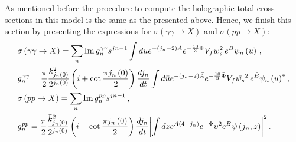 \documentclass[a4paper,12pt]{article}
\begin{document}
As mentioned before the procedure to compute the holographic total cross-sections in this model is the same as the presented above. Hence, we finish this section by presenting the expressions for $\sigma\left(\gamma \gamma \to X\right)$ and $\sigma\left(p p \to X\right)$:
\begin{align}
&\sigma\left(\gamma \gamma \rightarrow X\right) =  \sum_n {\rm Im} \, g^{\gamma \gamma}_n s^{jn-1} \int du e^{-\left(j_n - 2 \right)A } e^{-\frac{10}{3} \Phi} V_f w_s^2  \, e^B \psi_n\left(u\right)  \, , \label{eq:sigma_gg_hol_gens}  \\
&g^{\gamma \gamma}_n = \frac{\pi}{2} \frac{k^2_{j_n\left(0\right)}}{2^{j_n\left(0\right)}}  \left(i + \cot \frac{\pi j_n\left(0\right)}{2} \right) \frac{d j_n}{dt}  \int d\bar{u} e^{-\left(j_n - 2 \right)\bar{A} } e^{-\frac{10}{3} \bar{\Phi}} \bar{V_f} \bar{w_s}^2  \, e^{\bar{B}} {\psi_n\left(u\right)}^{*} \, , \\
& \sigma\left( p p \to X \right) = \sum_n {\rm Im} \, g^{p p}_n s^{jn-1}  \, , \label{eq:sigma_pp_hol_gens} \\
&g^{p p}_n = \frac{\pi}{2} \frac{\bar{k}^2_{j_n\left(0\right)}}{2^{j_n\left(0\right)}}  \left(i + \cot \frac{\pi j_n\left(0\right)}{2} \right) \frac{d j_n}{dt} {\left| \int dz  e^{A\left( 4 - j_n \right)} e^{-\Phi}  {\bar{\upsilon}}^2 e^{B}  {\psi\left(j_n, z\right)} \right|}^2  \, .
\end{align}
\end{document}
